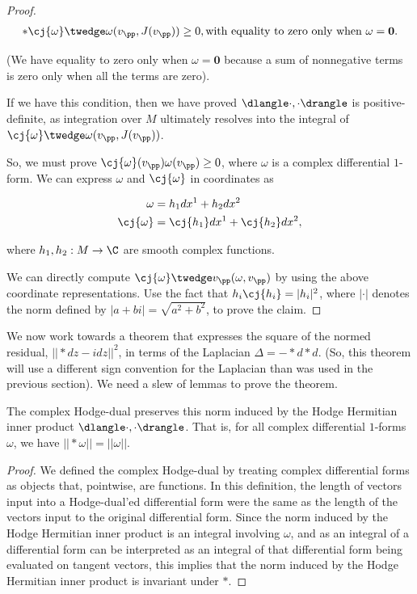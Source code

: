 \begin{proof}
    \begin{align*}
        *\cj{\omega} \twedge \omega(v_\pp, J(v_\pp)) \geq 0, \text{with equality to zero only when $\omega = \mathbf{0}$}.
    \end{align*}
    
    (We have equality to zero only when $\omega = \mathbf{0}$ because a sum of nonnegative terms is zero only when all the terms are zero).
    
    If we have this condition, then we have proved $\dlangle \cdot, \cdot \drangle$ is positive-definite, as integration over $M$ ultimately resolves into the integral of $\cj{\omega} \twedge \omega(v_\pp, J(v_\pp))$.
    
    So, we must prove $\cj{\omega}(v_\pp) \omega(v_\pp) \geq 0$, where $\omega$ is a complex differential $1$-form. We can express $\omega$ and $\cj{\omega}$ in coordinates as
    
    \begin{align*}
        \omega &= h_1 dx^1 + h_2 dx^2 \\
        \cj{\omega} &= \cj{h_1} dx^1 + \cj{h_2} dx^2,
    \end{align*}
    
    where $h_1, h_2:M \rightarrow \C$ are smooth complex functions.
    
    We can directly compute $\cj{\omega} \twedge v_\pp(\omega, v_\pp)$ by using the above coordinate representations. Use the fact that $h_i \cj{h_i} = |h_i|^2$, where $|\cdot|$ denotes the norm defined by $|a + bi| = \sqrt{a^2 + b^2}$, to prove the claim.
\end{proof}

We now work towards a theorem that expresses the square of the normed residual, $||*dz - idz||^2$, in terms of the Laplacian $\Delta = -*d*d$. (So, this theorem will use a different sign convention for the Laplacian than was used in the previous section). We need a slew of lemmas to prove the theorem.

\begin{lemma}
     The complex Hodge-dual preserves this norm  induced by the Hodge Hermitian inner product $\dlangle \cdot, \cdot \drangle$. That is, for all complex differential $1$-forms $\omega$, we have $||*\omega|| = ||\omega||$.
\end{lemma}

\begin{proof}
    We defined the complex Hodge-dual by treating complex differential forms as objects that, pointwise, are functions. In this definition, the length of vectors input into a Hodge-dual'ed differential form were the same as the length of the vectors input to the original differential form. Since the norm induced by the Hodge Hermitian inner product is an integral involving $\omega$, and as an integral of a differential form can be interpreted as an integral of that differential form being evaluated on tangent vectors, this implies that the norm induced by the Hodge Hermitian inner product is invariant under $*$.
\end{proof}

